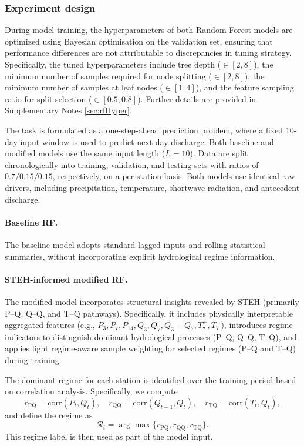 \documentclass[11pt]{article}
\begin{document}
\subsubsection*{Experiment design}

During model training, the hyperparameters of both Random Forest models are optimized using Bayesian optimisation on the validation set\cite{BO_OPT}, ensuring that performance differences are not attributable to discrepancies in tuning strategy. Specifically, the tuned hyperparameters include tree depth ($\in [2, 8]$), the minimum number of samples required for node splitting ($\in [2, 8]$), the minimum number of samples at leaf nodes ($\in [1, 4]$), and the feature sampling ratio for split selection ($\in [0.5, 0.8]$). Further details are provided in Supplementary Notes \ref{sec:rfHyper}.

The task is formulated as a one-step-ahead prediction problem, where a fixed 10-day input window is used to predict next-day discharge. Both baseline and modified models use the same input length ($L=10$). Data are split chronologically into training, validation, and testing sets with ratios of $0.7/0.15/0.15$, respectively, on a per-station basis. Both models use identical raw drivers, including precipitation, temperature, shortwave radiation, and antecedent discharge.

\paragraph{Baseline RF.}
The baseline model adopts standard lagged inputs and rolling statistical summaries, without incorporating explicit hydrological regime information.

\paragraph{STEH-informed modified RF.}
The modified model incorporates structural insights revealed by STEH (primarily P--Q, Q--Q, and T--Q pathways). Specifically, it includes physically interpretable aggregated features (e.g., $P_{3}, P_{7}, P_{14}, Q_{3}, Q_{7}, Q_{3}-Q_{7}, T_{7}^{+}, T_{7}^{-}$), introduces regime indicators to distinguish dominant hydrological processes (P--Q, Q--Q, T--Q), and applies light regime-aware sample weighting for selected regimes (P--Q and T--Q) during training.

The dominant regime for each station is identified over the training period based on correlation analysis\cite{Wrr_p_q}. Specifically, we compute
\begin{equation}
    r_{\mathrm{PQ}} = \mathrm{corr}(P_t, Q_t),
    \quad
    r_{\mathrm{QQ}} = \mathrm{corr}(Q_{t-1}, Q_t),
    \quad
    r_{\mathrm{TQ}} = \mathrm{corr}(T_t, Q_t),
\end{equation}
and define the regime as
\begin{equation}
    \mathcal{R}_i = \arg\max\{r_{\mathrm{PQ}}, r_{\mathrm{QQ}}, r_{\mathrm{TQ}}\}.
\end{equation}
This regime label is then used as part of the model input.
\end{document}
